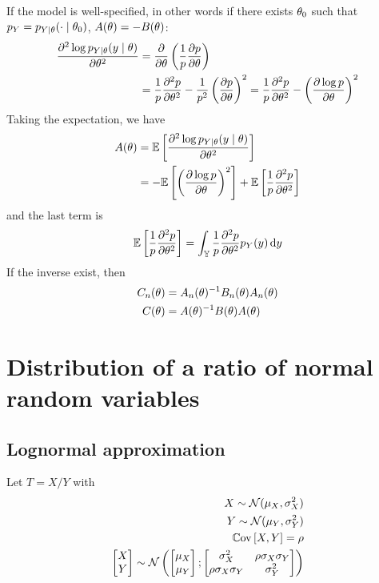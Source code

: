 \documentclass[../../Main_ManuscritThese.tex]{subfiles}
\begin{document}
  If the model is well-specified, in other words if there exists $\theta_0$ such that $p_Y = p_{Y\mid \theta}(\cdot \mid\theta_0)$, $A(\theta) = -B(\theta)$:
  \begin{align}
    \frac{\partial^2 \log p_{Y\mid \theta}(y \mid \theta)}{\partial \theta^2} &= \frac{\partial }{\partial \theta}\left(\frac{1}{p}\frac{\partial p}{\partial \theta}\right) \\
    &= \frac{1}{p}\frac{\partial^2 p}{\partial \theta^2} - \frac{1}{p^2}\left(\frac{\partial p}{\partial \theta}\right)^2 = \frac{1}{p}\frac{\partial^2 p}{\partial \theta^2} - \left(\frac{\partial \log p}{\partial \theta}\right)^2
  \end{align}
  Taking the expectation, we have
  \begin{align}
    A(\theta) &= \mathbb{E}\left[\frac{\partial^2 \log p_{Y\mid \theta}(y \mid \theta)}{\partial \theta^2}\right] \\
           &= -\mathbb{E}\left[\left(\frac{\partial \log p}{\partial \theta}\right)^2\right] + \mathbb{E}\left[\frac{1}{p}\frac{\partial^2 p}{\partial \theta^2}\right]
  \end{align}
  and the last term is
  \begin{align}
     \mathbb{E}\left[\frac{1}{p}\frac{\partial^2 p}{\partial \theta^2}\right] = \int_{\mathbb{Y}} \frac{1}{p}\frac{\partial^2 p}{\partial \theta^2} p_{Y}(y) \,\mathrm{d}y
  \end{align}
  If the inverse exist,
  then
  \begin{align}
    C_n(\theta) &= A_n(\theta)^{-1} B_n(\theta) A_n(\theta) \\
    C(\theta) &= A(\theta)^{-1}B(\theta)A(\theta)
  \end{align}

  \section{Distribution of a ratio of normal random variables}
  \label{sec:lognorm_ratio}
\subsection{Lognormal approximation}

Let $T = X/Y$ with
  \begin{align}
    X \sim \mathcal{N}(\mu_X, \sigma^2_X) \\
    Y \sim \mathcal{N}(\mu_Y, \sigma^2_Y) \\
    \Cov\left[X, Y\right] = \rho \\
    \begin{bmatrix}
      X \\ Y
    \end{bmatrix} \sim \mathcal{N}\left(%
    \begin{bmatrix}
      \mu_X \\ \mu_Y
    \end{bmatrix};%
    \begin{bmatrix}
      \sigma^2_X  & \rho \sigma_X \sigma_Y \\
      \rho\sigma_X \sigma_Y & \sigma^2_Y
    \end{bmatrix} \right)
  \end{align}
  
\end{document}
